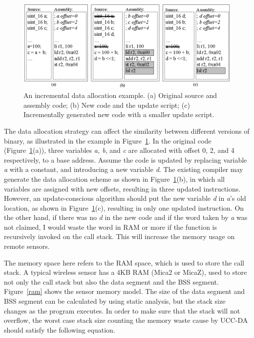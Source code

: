 \begin{figure}[htbp]
\centering
\includegraphics[width=5.5in]{figures/fdata.0.eps}
\caption[An example of incremental data allocation.]{An incremental data allocation example.
(a) Original source and assembly code;
(b) New code and the update script;
(c) Incrementally generated new code with a smaller update script.}
\label{fdata.0}
\end{figure}

The data allocation
strategy can affect the similarity between different versions of
binary, as illustrated in the example in Figure~\ref{fdata.0}.  In the
original code (Figure~\ref{fdata.0}(a)), three variables {\it a, b},
and {\it c} are allocated with offset 0, 2, and 4 respectively, to a
base address. Assume the code is updated by replacing variable {\it a}
with a constant, and introducing a new variable {\it d}. The existing
compiler may generate the data allocation scheme as shown in Figure~\ref{fdata.0}(b), in which all variables are 
assigned with new
offsets, resulting in three updated instructions. However, an update-conscious algorithm should put the new
variable {\it d} in {\it a}'s old location, as shown in
Figure~\ref{fdata.0}(c), resulting in only one updated instruction. 
On the other hand, if there was no {\it d} in the new code and
if the word taken by {\it a} was not claimed, I would waste the
word in RAM or more if the function is recursively
invoked on the call stack. This will increase the memory usage on remote sensors.


The memory space here refers to the RAM space, 
which is used to store the call stack. A typical wireless sensor has a
4KB RAM (Mica2 or MicaZ), used to store not only the call stack but
also the data segment and the BSS segment. Figure~\ref{ram} shows the sensor memory
model. The size of the data segment and BSS segment can be calculated
by using static analysis, but the stack size changes as the program
executes. In order to make sure that the stack will not overflow,
the worst case stack size counting the memory waste cause by UCC-DA should satisfy the following equation.

